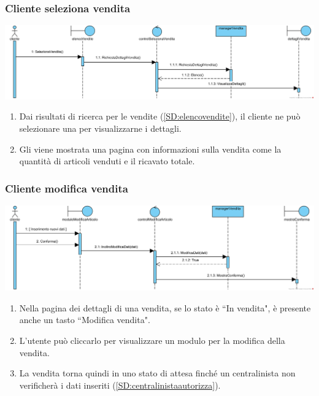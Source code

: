\documentclass[12pt]{article}
\begin{document}
\subsubsection{Cliente seleziona vendita}
\label{SD:selezionavenditacliente}

\begin{center}
\includegraphics[width=\textwidth]{SequenceDiagram/ClienteVenditaSeleziona}
\end{center}

\begin{enumerate}
\item Dai risultati di ricerca per le vendite (\ref{SD:elencovendite}), il cliente ne può selezionare una per visualizzarne i dettagli.
\item Gli viene mostrata una pagina con informazioni sulla vendita come la quantità di articoli venduti e il ricavato totale.
\end{enumerate}

\subsubsection{Cliente modifica vendita}
\label{SD:modificavendita}

\begin{center}
\includegraphics[width=\textwidth]{SequenceDiagram/ClienteVenditaModifica}
\end{center}

\begin{enumerate}
\item Nella pagina dei dettagli di una vendita, se lo stato è ``In vendita", è presente anche un tasto ``Modifica vendita".
\item L'utente può cliccarlo per visualizzare un modulo per la modifica della vendita. 
\item La vendita torna quindi in uno stato di attesa finché un centralinista non verificherà i dati inseriti (\ref{SD:centralinistaautorizza}).
\end{enumerate}
\end{document}
